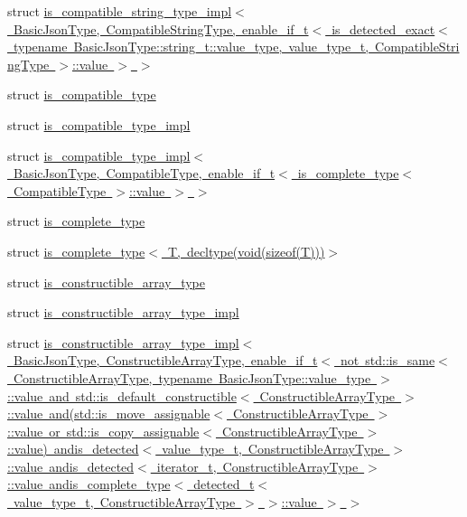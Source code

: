 \begin{DoxyCompactItemize}
\item 
struct \mbox{\hyperlink{structnlohmann_1_1detail_1_1is__compatible__string__type__impl_3_01_basic_json_type_00_01_compat6590904cab40fc73f430e4c7518179a2}{is\+\_\+compatible\+\_\+string\+\_\+type\+\_\+impl$<$ Basic\+Json\+Type, Compatible\+String\+Type, enable\+\_\+if\+\_\+t$<$ is\+\_\+detected\+\_\+exact$<$ typename Basic\+Json\+Type\+::string\+\_\+t\+::value\+\_\+type, value\+\_\+type\+\_\+t, Compatible\+String\+Type $>$\+::value $>$ $>$}}
\item 
struct \mbox{\hyperlink{structnlohmann_1_1detail_1_1is__compatible__type}{is\+\_\+compatible\+\_\+type}}
\item 
struct \mbox{\hyperlink{structnlohmann_1_1detail_1_1is__compatible__type__impl}{is\+\_\+compatible\+\_\+type\+\_\+impl}}
\item 
struct \mbox{\hyperlink{structnlohmann_1_1detail_1_1is__compatible__type__impl_3_01_basic_json_type_00_01_compatible_typ632bee7ec037fc0233f1bbe9dd7d8874}{is\+\_\+compatible\+\_\+type\+\_\+impl$<$ Basic\+Json\+Type, Compatible\+Type, enable\+\_\+if\+\_\+t$<$ is\+\_\+complete\+\_\+type$<$ Compatible\+Type $>$\+::value $>$ $>$}}
\item 
struct \mbox{\hyperlink{structnlohmann_1_1detail_1_1is__complete__type}{is\+\_\+complete\+\_\+type}}
\item 
struct \mbox{\hyperlink{structnlohmann_1_1detail_1_1is__complete__type_3_01_t_00_01decltype_07void_07sizeof_07_t_08_08_08_4}{is\+\_\+complete\+\_\+type$<$ T, decltype(void(sizeof(\+T)))$>$}}
\item 
struct \mbox{\hyperlink{structnlohmann_1_1detail_1_1is__constructible__array__type}{is\+\_\+constructible\+\_\+array\+\_\+type}}
\item 
struct \mbox{\hyperlink{structnlohmann_1_1detail_1_1is__constructible__array__type__impl}{is\+\_\+constructible\+\_\+array\+\_\+type\+\_\+impl}}
\item 
struct \mbox{\hyperlink{structnlohmann_1_1detail_1_1is__constructible__array__type__impl_3_01_basic_json_type_00_01_cons437c79c936c626a4ffcf289ee9218c26}{is\+\_\+constructible\+\_\+array\+\_\+type\+\_\+impl$<$ Basic\+Json\+Type, Constructible\+Array\+Type, enable\+\_\+if\+\_\+t$<$ not std\+::is\+\_\+same$<$ Constructible\+Array\+Type, typename Basic\+Json\+Type\+::value\+\_\+type $>$\+::value and std\+::is\+\_\+default\+\_\+constructible$<$ Constructible\+Array\+Type $>$\+::value and(std\+::is\+\_\+move\+\_\+assignable$<$ Constructible\+Array\+Type $>$\+::value or std\+::is\+\_\+copy\+\_\+assignable$<$ Constructible\+Array\+Type $>$\+::value) andis\+\_\+detected$<$ value\+\_\+type\+\_\+t, Constructible\+Array\+Type $>$\+::value andis\+\_\+detected$<$ iterator\+\_\+t, Constructible\+Array\+Type $>$\+::value andis\+\_\+complete\+\_\+type$<$ detected\+\_\+t$<$ value\+\_\+type\+\_\+t, Constructible\+Array\+Type $>$ $>$\+::value $>$ $>$}}

\end{DoxyCompactItemize}

